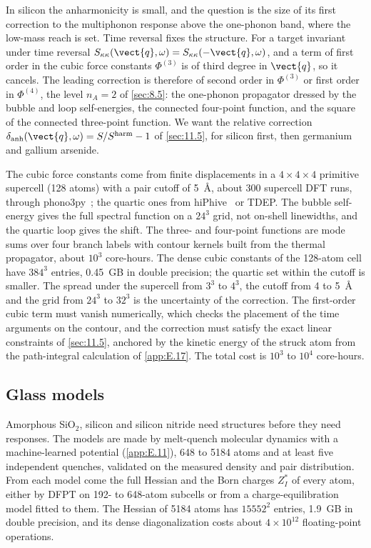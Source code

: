 In silicon the anharmonicity is small, and the question is the size of its first correction to the multiphonon response above the one-phonon band, where the low-mass reach is set. Time reversal fixes the structure. For a target invariant under time reversal $S_{\kappa\kappa}(\vect{q},\omega) = S_{\kappa\kappa}(-\vect{q},\omega)$, and a term of first order in the cubic force constants $\Phi^{(3)}$ is of third degree in $\vect{q}$, so it cancels. The leading correction is therefore of second order in $\Phi^{(3)}$ or first order in $\Phi^{(4)}$, the level $n_A = 2$ of \cref{sec:8.5}: the one-phonon propagator dressed by the bubble and loop self-energies, the connected four-point function, and the square of the connected three-point function. We want the relative correction $\delta_{\mathrm{anh}}(\vect{q},\omega) = S/S^{\mathrm{harm}} - 1$ of \cref{sec:11.5}, for silicon first, then germanium and gallium arsenide.

The cubic force constants come from finite displacements in a $4\times4\times4$ primitive supercell (128 atoms) with a pair cutoff of \SI{5}{\angstrom}, about 300 supercell DFT runs, through phono3py~\cite{togo2015distributions}; the quartic ones from hiPhive~\cite{eriksson2019hiphive} or TDEP. The bubble self-energy gives the full spectral function on a $24^3$ grid, not on-shell linewidths, and the quartic loop gives the shift. The three- and four-point functions are mode sums over four branch labels with contour kernels built from the thermal propagator, about $10^3$ core-hours. The dense cubic constants of the 128-atom cell have $384^3$ entries, \SI{0.45}{GB} in double precision; the quartic set within the cutoff is smaller. The spread under the supercell from $3^3$ to $4^3$, the cutoff from 4 to \SI{5}{\angstrom} and the grid from $24^3$ to $32^3$ is the uncertainty of the correction. The first-order cubic term must vanish numerically, which checks the placement of the time arguments on the contour, and the correction must satisfy the exact linear constraints of \cref{sec:11.5}, anchored by the kinetic energy of the struck atom from the path-integral calculation of \cref{app:E.17}. The total cost is $10^3$ to $10^4$ core-hours.

\subsection{Glass models}

Amorphous SiO$_2$, silicon and silicon nitride need structures before they need responses. The models are made by melt-quench molecular dynamics with a machine-learned potential (\cref{app:E.11}), 648 to 5184 atoms and at least five independent quenches, validated on the measured density and pair distribution. From each model come the full Hessian and the Born charges $Z^*_I$ of every atom, either by DFPT on 192- to 648-atom subcells or from a charge-equilibration model fitted to them. The Hessian of 5184 atoms has $15552^2$ entries, \SI{1.9}{GB} in double precision, and its dense diagonalization costs about $4\times10^{12}$ floating-point operations.

